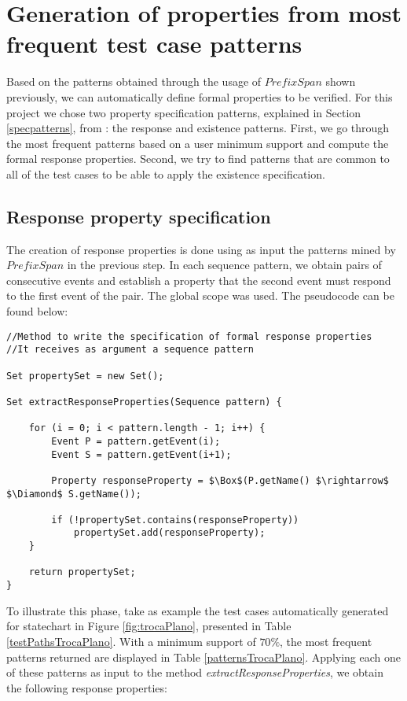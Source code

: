 \section{Generation of properties from most frequent test case patterns}
\label{genproppatterns}

Based on the patterns obtained through the usage of $PrefixSpan$ shown previously, we can automatically define formal properties to be verified. For this project we chose two property specification patterns, explained in Section \ref{specpatterns}, from \cite{dwyer98}: the response and existence patterns. First, we go through the most frequent patterns based on a user minimum support and compute the formal response properties. Second, we  try to find patterns that are common to all of the test cases to be able to apply the existence specification.

\subsection{Response property specification}
\label{responseSpec}

The creation of response properties is done using as input the patterns mined by $PrefixSpan$ in the previous step. In each sequence pattern, we obtain pairs of consecutive events and establish a property that the second event must respond to the first event of the pair. The global scope was used. The pseudocode can be found below:

\begin{lstlisting}[mathescape,caption={Pseudocode to extract response properties from the mining results}]
//Method to write the specification of formal response properties
//It receives as argument a sequence pattern 

Set propertySet = new Set();

Set extractResponseProperties(Sequence pattern) {

	for (i = 0; i < pattern.length - 1; i++) {
		Event P = pattern.getEvent(i);
		Event S = pattern.getEvent(i+1);

		Property responseProperty = $\Box$(P.getName() $\rightarrow$ $\Diamond$ S.getName());

		if (!propertySet.contains(responseProperty))
			propertySet.add(responseProperty);
	}

	return propertySet;
}
\end{lstlisting}

To illustrate this phase, take as example the test cases automatically generated for statechart in Figure \ref{fig:trocaPlano}, presented in Table \ref{testPathsTrocaPlano}. With a minimum support of $70\%$, the most frequent patterns returned are displayed in Table \ref{patternsTrocaPlano}. Applying each one of these patterns as input to the method \textit{extractResponseProperties}, we obtain the following response properties:

